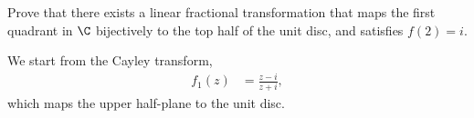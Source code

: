 \documentclass[10pt]{mypackage}
\begin{document}
\begin{problem}[Problem 3]
  Prove that there exists a linear fractional transformation that maps the first quadrant in $\C$ bijectively to the top half of the unit disc, and satisfies $f(2) = i$.
\end{problem}
\begin{solution}
  We start from the Cayley transform,
  \begin{align*}
    f_1(z) &= \frac{z-i}{z+i},
  \end{align*}
  which maps the upper half-plane to the unit disc.
\end{solution}
\end{document}
